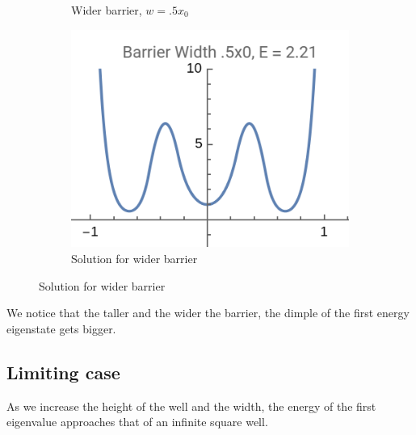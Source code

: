 \documentclass{article}
\numberwithin{equation}{section}
\begin{document}
\begin{figure}[htp]
\begin{subfigure}[b]{0.45\textwidth}
        \caption{Wider barrier, $w = .5x_0$}
        \label{fig:fig3}
    \end{subfigure}
    \hfill
    \begin{subfigure}[b]{0.45\textwidth}
        \includegraphics[width=\textwidth]{III3_widerSol.png}
        \caption{Solution for wider barrier}
        \label{fig:fig4}
    \end{subfigure}
    \label{fig:overall}
\end{figure}

We notice that the taller and the wider the barrier, 
the dimple of the first energy eigenstate gets bigger. 

\subsection{Limiting case}
As we increase the height of the well and the width, 
the energy of the first eigenvalue approaches that 
of an infinite square well. 
\end{document}
